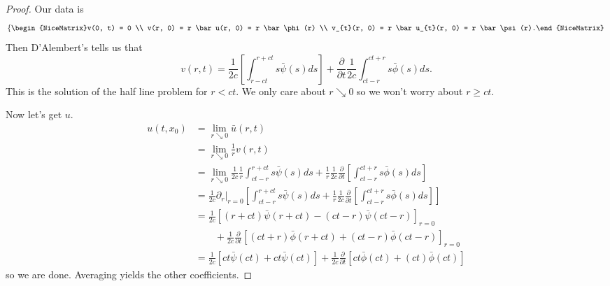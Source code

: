 \begin{proof}
	Our data is
	\[ \left\{\begin{NiceMatrix}v(0, t) = 0 \\ v(r, 0) = r \bar u(r, 0) = r \bar \phi(r) \\ v_{t}(r, 0) = r \bar u_{t}(r, 0) = r \bar \psi(r).\end{NiceMatrix}\right.  \]
	Then D'Alembert's tells us that
	\[ v(r, t) = \frac{1}{2c} \left[ \int_{r - ct}^{r + ct} s \bar \psi(s) ds \right] + \frac{\partial}{\partial t} \frac{1}{2c}\int_{ct - r}^{ct + r} s \bar \phi(s) ds.  \]
	This is the solution of the half line problem for \( r < ct \). We only care about \( r \searrow 0 \) so we won't worry about \( r \ge ct \). 

	Now let's get \( u \). 
	\begin{align*}
		u(t, x_{0}) &= \lim_{r \searrow 0} \bar u(r, t)\\
							 &= \lim_{r \searrow 0}\frac{1}{r} v(r, t) \\
							 &= \lim_{r \searrow 0} \frac{1}{2 c} \frac{1}{r} \int_{ct - r}^{r + ct} s \bar \psi(s) ds + \frac{1}{r} \frac{1}{2 c} \frac{\partial}{\partial t} \left[ \int_{ct - r}^{ct + r} s \bar \phi(s) ds \right] \\
							 &= \frac{1}{2 c} \left.\partial_{r} \right|_{r = 0}\left[ \int_{ct - r}^{r + ct} s \bar \psi(s) ds + \frac{1}{r} \frac{1}{2 c} \frac{\partial}{\partial t} \left[ \int_{ct - r}^{ct + r} s \bar \phi(s) ds \right] \right] \\
							 &= \frac{1}{2 c} \left[ (r + ct) \bar \psi(r + ct) - (ct - r) \bar \psi(ct - r) \right]_{r = 0} \\ 
							 &\qquad+ \frac{1}{2c} \frac{\partial}{\partial t} \left[ (ct+r) \bar \phi(r + ct) + (ct - r) \bar \phi(ct -r) \right]_{r = 0}  \\
							 &= \frac{1}{2 c} \left[ ct \bar \psi(ct) +ct \bar \psi(ct) \right] + \frac{1}{2c} \frac{\partial}{\partial t} \left[ ct \bar \phi(ct) + (ct) \bar \phi(ct) \right]  
	\end{align*}
	\enlargethispage{\baselineskip}
	so we are done. Averaging yields the other coefficients.
\end{proof}
